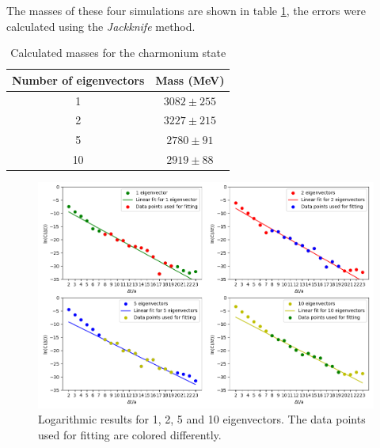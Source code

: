     The masses of these four simulations are shown in table \ref{meson_masses}, the errors were calculated using the \textit{Jackknife} \cite{jackknife} method.
    \begin{table}[h]
            \centering
            \begin{tabular}{|c|c|}
            \hline
            \multicolumn{1}{|c|}{Number of eigenvectors} & \multicolumn{1}{c|}{Mass (MeV)} \\ \hline
             1 & $3082 \pm 255$\\
             2 & $3227 \pm 215$\\
             5 & $2780 \pm 91$\\
             10& $2919 \pm 88$\\
              \hline
            \end{tabular}
            \caption{Calculated masses for the charmonium state}
            \label{meson_masses}
        \end{table}
    
    
    
    \begin{figure}[H]
        \centering
        \includegraphics[width=1\textwidth]{images/1_2_5_10_evs_side.png}
        \caption{Logarithmic results for 1, 2, 5 and 10 eigenvectors. The data points used for fitting are colored differently.}
        \label{1_2_5_10_evs_log_separate}
    \end{figure}